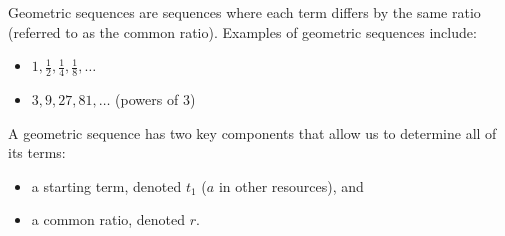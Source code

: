 Geometric sequences are sequences where each term differs by the same ratio (referred to as the common ratio). Examples of geometric sequences include:

\begin{itemize}
  \item $1, \frac{1}{2}, \frac{1}{4}, \frac{1}{8}, \dots$
  \item $3, 9, 27, 81, \dots$ (powers of 3)
\end{itemize}

A geometric sequence has two key components that allow us to determine all of its terms: 

\begin{itemize}
  \item a starting term, denoted $t_1$ ($a$ in other resources), and
  \item a common ratio, denoted $r$.
\end{itemize}

